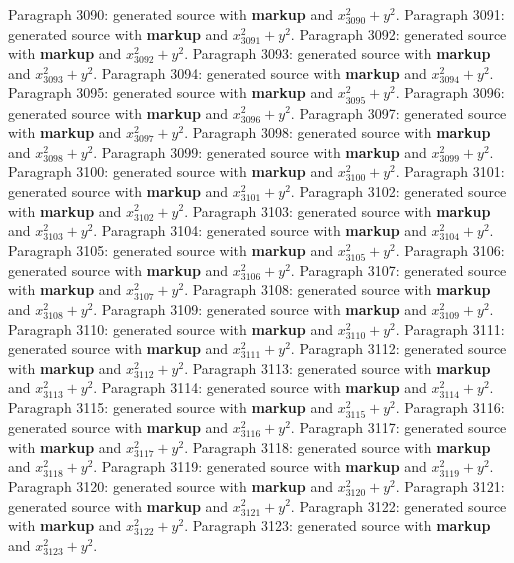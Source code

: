 \documentclass{article}
\begin{document}
Paragraph 3090: generated source with \textbf{markup} and $x_{3090}^2 + y^2$.
Paragraph 3091: generated source with \textbf{markup} and $x_{3091}^2 + y^2$.
Paragraph 3092: generated source with \textbf{markup} and $x_{3092}^2 + y^2$.
Paragraph 3093: generated source with \textbf{markup} and $x_{3093}^2 + y^2$.
Paragraph 3094: generated source with \textbf{markup} and $x_{3094}^2 + y^2$.
Paragraph 3095: generated source with \textbf{markup} and $x_{3095}^2 + y^2$.
Paragraph 3096: generated source with \textbf{markup} and $x_{3096}^2 + y^2$.
Paragraph 3097: generated source with \textbf{markup} and $x_{3097}^2 + y^2$.
Paragraph 3098: generated source with \textbf{markup} and $x_{3098}^2 + y^2$.
Paragraph 3099: generated source with \textbf{markup} and $x_{3099}^2 + y^2$.
Paragraph 3100: generated source with \textbf{markup} and $x_{3100}^2 + y^2$.
Paragraph 3101: generated source with \textbf{markup} and $x_{3101}^2 + y^2$.
Paragraph 3102: generated source with \textbf{markup} and $x_{3102}^2 + y^2$.
Paragraph 3103: generated source with \textbf{markup} and $x_{3103}^2 + y^2$.
Paragraph 3104: generated source with \textbf{markup} and $x_{3104}^2 + y^2$.
Paragraph 3105: generated source with \textbf{markup} and $x_{3105}^2 + y^2$.
Paragraph 3106: generated source with \textbf{markup} and $x_{3106}^2 + y^2$.
Paragraph 3107: generated source with \textbf{markup} and $x_{3107}^2 + y^2$.
Paragraph 3108: generated source with \textbf{markup} and $x_{3108}^2 + y^2$.
Paragraph 3109: generated source with \textbf{markup} and $x_{3109}^2 + y^2$.
Paragraph 3110: generated source with \textbf{markup} and $x_{3110}^2 + y^2$.
Paragraph 3111: generated source with \textbf{markup} and $x_{3111}^2 + y^2$.
Paragraph 3112: generated source with \textbf{markup} and $x_{3112}^2 + y^2$.
Paragraph 3113: generated source with \textbf{markup} and $x_{3113}^2 + y^2$.
Paragraph 3114: generated source with \textbf{markup} and $x_{3114}^2 + y^2$.
Paragraph 3115: generated source with \textbf{markup} and $x_{3115}^2 + y^2$.
Paragraph 3116: generated source with \textbf{markup} and $x_{3116}^2 + y^2$.
Paragraph 3117: generated source with \textbf{markup} and $x_{3117}^2 + y^2$.
Paragraph 3118: generated source with \textbf{markup} and $x_{3118}^2 + y^2$.
Paragraph 3119: generated source with \textbf{markup} and $x_{3119}^2 + y^2$.
Paragraph 3120: generated source with \textbf{markup} and $x_{3120}^2 + y^2$.
Paragraph 3121: generated source with \textbf{markup} and $x_{3121}^2 + y^2$.
Paragraph 3122: generated source with \textbf{markup} and $x_{3122}^2 + y^2$.
Paragraph 3123: generated source with \textbf{markup} and $x_{3123}^2 + y^2$.
\end{document}
